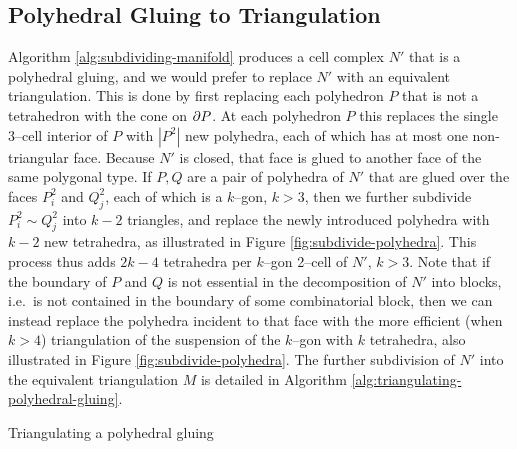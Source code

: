 
\subsection{Polyhedral Gluing to Triangulation}

Algorithm \ref{alg:subdividing-manifold} produces a cell complex $N'$ that is a polyhedral gluing, and we would prefer to replace $N'$ with an equivalent triangulation.
This is done by first replacing each polyhedron $P$ that is not a tetrahedron with the cone on $\partial P$.
At each polyhedron $P$ this replaces the single 3--cell interior of $P$ with $|P^2|$ new polyhedra, each of which has at most one non-triangular face.
Because $N'$ is closed, that face is glued to another face of the same polygonal type.
If $P,Q$ are a pair of polyhedra of $N'$ that are glued over the faces $P_i^2$ and $Q_j^2$, each of which is a $k$--gon, $k>3$, then we further subdivide $P_i^2\sim Q_j^2$ into $k-2$ triangles, and replace the newly introduced polyhedra with $k-2$ new tetrahedra, as illustrated in Figure \ref{fig:subdivide-polyhedra}.
This process thus adds $2k-4$ tetrahedra per $k$--gon 2--cell of $N'$, $k>3$.
Note that if the boundary of $P$ and $Q$ is not essential in the decomposition of $N'$ into blocks, i.e.\ is not contained in the boundary of some combinatorial block, then we can instead replace the polyhedra incident to that face with the more efficient (when $k>4$) triangulation of the suspension of the $k$--gon with $k$ tetrahedra, also illustrated in Figure \ref{fig:subdivide-polyhedra}.
The further subdivision of $N'$ into the equivalent triangulation $M$ is detailed in Algorithm \ref{alg:triangulating-polyhedral-gluing}.

\begin{algorithm}[h!]
	\caption{Triangulating a polyhedral gluing}
	\label{alg:triangulating-polyhedral-gluing}
\end{algorithm}

